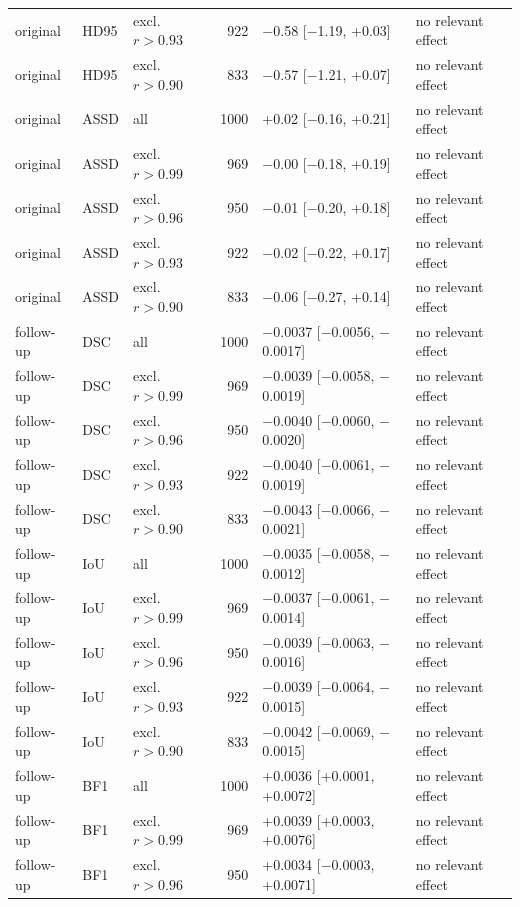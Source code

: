 \begin{tabular}{lllrll}
original & HD95 & excl. $r>0.93$ & 922 & $-$0.58 [$-$1.19, +0.03] & no relevant effect \\
original & HD95 & excl. $r>0.90$ & 833 & $-$0.57 [$-$1.21, +0.07] & no relevant effect \\
original & ASSD & all & 1000 & +0.02 [$-$0.16, +0.21] & no relevant effect \\
original & ASSD & excl. $r>0.99$ & 969 & $-$0.00 [$-$0.18, +0.19] & no relevant effect \\
original & ASSD & excl. $r>0.96$ & 950 & $-$0.01 [$-$0.20, +0.18] & no relevant effect \\
original & ASSD & excl. $r>0.93$ & 922 & $-$0.02 [$-$0.22, +0.17] & no relevant effect \\
original & ASSD & excl. $r>0.90$ & 833 & $-$0.06 [$-$0.27, +0.14] & no relevant effect \\
follow-up & DSC & all & 1000 & $-$0.0037 [$-$0.0056, $-$0.0017] & no relevant effect \\
follow-up & DSC & excl. $r>0.99$ & 969 & $-$0.0039 [$-$0.0058, $-$0.0019] & no relevant effect \\
follow-up & DSC & excl. $r>0.96$ & 950 & $-$0.0040 [$-$0.0060, $-$0.0020] & no relevant effect \\
follow-up & DSC & excl. $r>0.93$ & 922 & $-$0.0040 [$-$0.0061, $-$0.0019] & no relevant effect \\
follow-up & DSC & excl. $r>0.90$ & 833 & $-$0.0043 [$-$0.0066, $-$0.0021] & no relevant effect \\
follow-up & IoU & all & 1000 & $-$0.0035 [$-$0.0058, $-$0.0012] & no relevant effect \\
follow-up & IoU & excl. $r>0.99$ & 969 & $-$0.0037 [$-$0.0061, $-$0.0014] & no relevant effect \\
follow-up & IoU & excl. $r>0.96$ & 950 & $-$0.0039 [$-$0.0063, $-$0.0016] & no relevant effect \\
follow-up & IoU & excl. $r>0.93$ & 922 & $-$0.0039 [$-$0.0064, $-$0.0015] & no relevant effect \\
follow-up & IoU & excl. $r>0.90$ & 833 & $-$0.0042 [$-$0.0069, $-$0.0015] & no relevant effect \\
follow-up & BF1 & all & 1000 & +0.0036 [+0.0001, +0.0072] & no relevant effect \\
follow-up & BF1 & excl. $r>0.99$ & 969 & +0.0039 [+0.0003, +0.0076] & no relevant effect \\
follow-up & BF1 & excl. $r>0.96$ & 950 & +0.0034 [$-$0.0003, +0.0071] & no relevant effect \\

\end{tabular}
